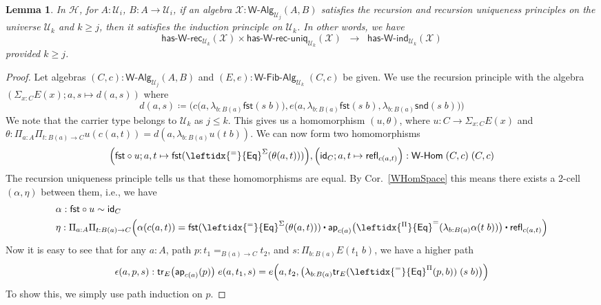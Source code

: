 \documentclass[reqno,10pt,a4paper,oneside]{amsart}
\newcommand{\X}{\mathcal{X}}
\newcommand{\fst}{\mathsf{fst}}
\newcommand{\snd}{\mathsf{snd}}
\newcommand{\comp}{\circ}
\newcommand{\idfun}[1]{\mathsf{id}_{#1}}
\newcommand{\prd}[1]{\Pi_{#1}}
\newcommand{\sm}[1]{\Sigma_{#1}}
\newcommand{\lam}[1]{\lambda_{#1}}
\newcommand{\defeq}{\coloneqq}
\newcommand{\refl}{\mathsf{refl}}
\newcommand{\funext}{\leftidx{^\Pi}{\mathsf{Eq}}^{=}}
\newcommand{\happly}{\leftidx{^=}{\mathsf{Eq}}^{\Pi}}
\newcommand{\idtodpair}{\leftidx{^=}{\mathsf{Eq}}^{\Sigma}}
\newcommand{\UU}{\mathcal{U}}
\newcommand{\WAlg}{\mathsf{W}\text{-}\mathsf{Alg}}
\newcommand{\WFibAlg}{\mathsf{W}\text{-}\mathsf{Fib}\text{-}\mathsf{Alg}}
\newcommand{\WHom}{\mathsf{W}\text{-}\mathsf{Hom}}
\newcommand{\HasWRec}{\mathsf{has}\text{-}\mathsf{W}\text{-}\mathsf{rec}}
\newcommand{\HasWInd}{\mathsf{has}\text{-}\mathsf{W}\text{-}\mathsf{ind}}
\newcommand{\HasWRecUniq}{\mathsf{has}\text{-}\mathsf{W}\text{-}\mathsf{rec}\text{-}\mathsf{uniq}}
\newcommand{\app}{\mathsf{ap}}
\newcommand{\trans}{\mathsf{tr}}
\newcommand{\Hint}{\mathcal{H}}
\newcommand{\ct}{%
  \mathchoice{\mathbin{\raisebox{0.5ex}{$\displaystyle\centerdot$}}}%
             {\mathbin{\raisebox{0.5ex}{$\centerdot$}}}%
             {\mathbin{\raisebox{0.25ex}{$\scriptstyle\,\centerdot\,$}}}%
             {\mathbin{\raisebox{0.1ex}{$\scriptscriptstyle\,\centerdot\,$}}}}
\numberwithin{equation}{section}
\theoremstyle{mythm}
\newtheorem{lemma}[theorem]{Lemma}
\theoremstyle{mydef}
\theoremstyle{myrmk}
\begin{document}
\begin{lemma}\label{lem:WRecUniqImpIndInt}
In $\Hint$, for $A:\UU_i$, $B : A \to \UU_i$, if an algebra $\X : \WAlg_{\UU_j}(A,B)$ satisfies the recursion and recursion uniqueness principles on the universe $\UU_k$ and $k \geq j$, then it satisfies the induction principle on $\UU_k$. In other words, we have
\[ \HasWRec_{\UU_k}(\X) \times \HasWRecUniq_{\UU_k}(\X) \;\; \rightarrow \; \; \HasWInd_{\UU_k}(\X) \]
provided $k \geq j$.
\end{lemma}
\begin{proof}
Let algebras $(C,c) : \WAlg_{\UU_j}(A,B)$ and $(E,e) : \WFibAlg_{\UU_k} \; (C,c)$ be given. We use the recursion principle with the algebra $(\sm{x:C} E(x); a,s \mapsto d(a,s))$ where
\[ d(a,s) \defeq \Big(c\big(a,\lam{b:B(a)} \fst(s\;b)\big), e\big(a, \lam{b:B(a)} \fst(s\;b), \lam{b:B(a)} \snd(s\;b)\big) \Big) \]
We note that the carrier type belongs to $\UU_k$ as $j \leq k$. This gives us a homomorphism $(u,\theta)$, where $u : C \to \sm{x:C} E(x)$ and $\theta : \prd{a:A}\prd{t:B(a)\to C} u(c(a,t)) = d(a,\lam{b:B(a)}u(t\;b))$. We can now form two homomorphisms 
\[\Big(\fst \comp u; a,t \mapsto \fst(\idtodpair(\theta(a,t)))\Big), \Big(\idfun{C}; a,t \mapsto \refl_{c(a,t)}\Big) : \WHom \; (C,c) \; (C,c)\]
The recursion uniqueness principle tells us that these homomorphisms are equal. By Cor.~\ref{WHomSpace} this means there exists a 2-cell $(\alpha,\eta)$ between them, i.e., we have 
\begin{align*}
& \alpha : \fst \comp u \sim \idfun{C} \\
& \eta : \prd{a:A}\prd{t:B(a)\to C} \Big(\alpha(c(a,t)) = \fst(\idtodpair(\theta(a,t))) \ct \app_{c(a)}\big(\funext(\lam{b:B(a)} \alpha(t\;b))\big) \ct \refl_{c(a,t)}\Big)
\end{align*}
Now it is easy to see that for any $a : A$, path $p : t_1 =_{B(a) \to C} t_2$, and $s : \prd{b:B(a)} E(t_1 \; b)$, we have a higher path
\[ \epsilon(a,p,s) : \trans_E\big(\app_{c(a)}(p)\big) \; e(a,t_1,s) = e\Big(a,t_2,\big(\lam{b:B(a)} \trans_E(\happly(p,b)) \; (s \; b)\big)\Big) \] 
To show this, we simply use path induction on $p$.


\end{proof}
\end{document}

